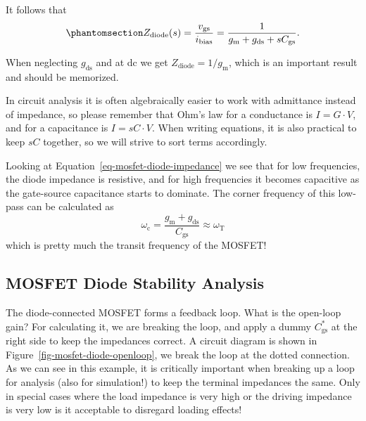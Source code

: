 \documentclass[
  a4paper,
  DIV=11,
  numbers=noendperiod]{scrartcl}
\begin{document}
It follows that
\begin{equation}\phantomsection\label{eq-mosfet-diode-impedance}{
Z_\mathrm{diode}(s) = \frac{v_\mathrm{gs}}{i_\mathrm{bias}} = \frac{1}{g_\mathrm{m}+ g_\mathrm{ds}+ s C_\mathrm{gs}}.
}\end{equation}

When neglecting \(g_\mathrm{ds}\) and at dc we get
\(Z_\mathrm{diode} = 1 / g_\mathrm{m}\), which is an important result
and should be memorized.

\begin{tcolorbox}[enhanced jigsaw, titlerule=0mm, left=2mm, coltitle=black, toprule=.15mm, breakable, opacitybacktitle=0.6, colframe=quarto-callout-important-color-frame, bottomtitle=1mm, toptitle=1mm, opacityback=0, colbacktitle=quarto-callout-important-color!10!white, title=\textcolor{quarto-callout-important-color}{\faExclamation}\hspace{0.5em}{The Admittance is Your Friend}, arc=.35mm, rightrule=.15mm, colback=white, bottomrule=.15mm, leftrule=.75mm]

In circuit analysis it is often algebraically easier to work with
admittance instead of impedance, so please remember that Ohm's law for a
conductance is \(I = G \cdot V\), and for a capacitance is
\(I = s C \cdot V\). When writing equations, it is also practical to
keep \(s C\) together, so we will strive to sort terms accordingly.

\end{tcolorbox}

Looking at Equation~\ref{eq-mosfet-diode-impedance} we see that for low
frequencies, the diode impedance is resistive, and for high frequencies
it becomes capacitive as the gate-source capacitance starts to dominate.
The corner frequency of this low-pass can be calculated as \[
\omega_\mathrm{c} = \frac{g_\mathrm{m}+ g_\mathrm{ds}}{C_\mathrm{gs}} \approx \omega_\mathrm{T}
\] which is pretty much the transit frequency of the MOSFET!

\subsection{MOSFET Diode Stability
Analysis}\label{mosfet-diode-stability-analysis}

The diode-connected MOSFET forms a feedback loop. What is the open-loop
gain? For calculating it, we are breaking the loop, and apply a dummy
\(C_\mathrm{gs}^{*}\) at the right side to keep the impedances correct.
A circuit diagram is shown in Figure~\ref{fig-mosfet-diode-openloop}, we
break the loop at the dotted connection. As we can see in this example,
it is critically important when breaking up a loop for analysis (also
for simulation!) to keep the terminal impedances the same. Only in
special cases where the load impedance is very high or the driving
impedance is very low is it acceptable to disregard loading effects!
\end{document}
